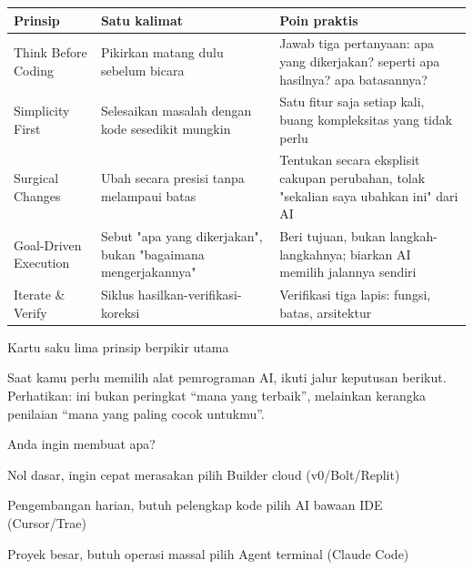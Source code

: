 


\begin{center}
\begin{tabularx}{\linewidth}{|X|X|X|}
\hline
\textbf{Prinsip} & \textbf{Satu kalimat} & \textbf{Poin praktis} \tabularnewline
\hline
Think Before Coding & Pikirkan matang dulu sebelum bicara & Jawab tiga pertanyaan: apa yang dikerjakan? seperti apa hasilnya? apa batasannya? \tabularnewline
Simplicity First & Selesaikan masalah dengan kode sesedikit mungkin & Satu fitur saja setiap kali, buang kompleksitas yang tidak perlu \tabularnewline
Surgical Changes & Ubah secara presisi tanpa melampaui batas & Tentukan secara eksplisit cakupan perubahan, tolak "sekalian saya ubahkan ini" dari AI \tabularnewline
Goal-Driven Execution & Sebut "apa yang dikerjakan", bukan "bagaimana mengerjakannya" & Beri tujuan, bukan langkah-langkahnya; biarkan AI memilih jalannya sendiri \tabularnewline
Iterate \& Verify & Siklus hasilkan-verifikasi-koreksi & Verifikasi tiga lapis: fungsi, batas, arsitektur \tabularnewline
\hline
\end{tabularx}
\end{center}

\begin{center}\small\color{gray}Kartu saku lima prinsip berpikir utama\end{center}


Saat kamu perlu memilih alat pemrograman AI, ikuti jalur keputusan berikut. Perhatikan: ini bukan peringkat “mana yang terbaik”, melainkan kerangka penilaian “mana yang paling cocok untukmu”.

Anda ingin membuat apa?

Nol dasar, ingin cepat merasakan pilih Builder cloud (v0/Bolt/Replit)

Pengembangan harian, butuh pelengkap kode pilih AI bawaan IDE (Cursor/Trae)

Proyek besar, butuh operasi massal pilih Agent terminal (Claude Code)

